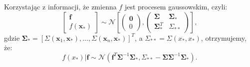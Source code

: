 \documentclass{mini}
\begin{document}
Korzystając z informacji, że zmienna $f$ jest procesem gaussowskim, czyli:
$$
\left[
	\begin{array}{c}
		\mathbf{f}\\
		f(\mathbf{x}_{\ast})
	\end{array}
\right] \sim \mathcal{N}
\left[
\left(
	\begin{array}{c}
		\mathbf{0}\\
		0
	\end{array}
\right)
,
\left(
	\begin{array}{cc}
		\mathbf{\Sigma} & \mathbf{\Sigma}_{\ast}\\
		\mathbf{\Sigma}_{\ast}^T & \Sigma_{\ast\ast}
	\end{array}
\right)
\right],
$$ 
gdzie $\mathbf{\Sigma}_{\ast} = [\Sigma(\mathbf{x}_1, \mathbf{x}_{\ast}), \ldots, \Sigma(\mathbf{x}_n, \mathbf{x}_{\ast})]^T$, a $\Sigma_{\ast\ast} = \Sigma(x_{\ast}, x_{\ast})$, otrzymujemy, że: 
\begin{equation}\label{calka21}
f(x_{\ast}) | \mathbf{f} \sim \mathcal{N}(\mathbf{f}^T\mathbf{\Sigma}^{-1}\mathbf{\Sigma}_{\ast}, \Sigma_{\ast\ast} - \mathbf{\Sigma}\mathbf{\Sigma}^{-1}\mathbf{\Sigma}_{\ast} ).
\end{equation}
\end{document}
